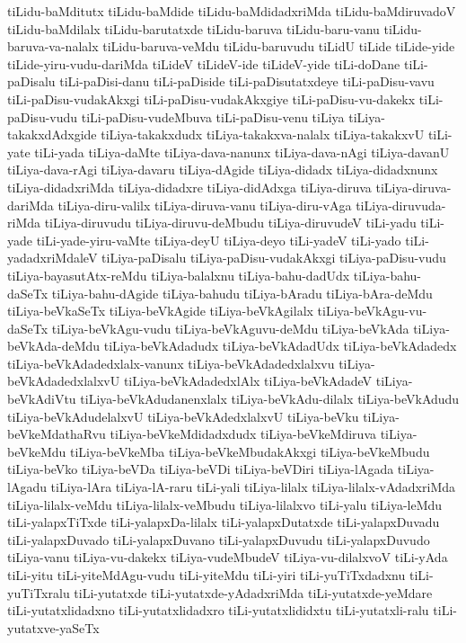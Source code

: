 {tiLidu-baMditutx
tiLidu-baMdide
tiLidu-baMdidadxriMda
tiLidu-baMdiruvadoV
tiLidu-baMdilalx
tiLidu-barutatxde
tiLidu-baruva
tiLidu-baru-vanu
tiLidu-baruva-va-nalalx
tiLidu-baruva-veMdu
tiLidu-baruvudu
tiLidU
tiLide
tiLide-yide
tiLide-yiru-vudu-dariMda
tiLideV
tiLideV-ide
tiLideV-yide
tiLi-doDane
tiLi-paDisalu
tiLi-paDisi-danu
tiLi-paDiside
tiLi-paDisutatxdeye
tiLi-paDisu-vavu
tiLi-paDisu-vudakAkxgi
tiLi-paDisu-vudakAkxgiye
tiLi-paDisu-vu-dakekx
tiLi-paDisu-vudu
tiLi-paDisu-vudeMbuva
tiLi-paDisu-venu
tiLiya
tiLiya-takakxdAdxgide
tiLiya-takakxdudx
tiLiya-takakxva-nalalx
tiLiya-takakxvU
tiLi-yate
tiLi-yada
tiLiya-daMte
tiLiya-dava-nanunx
tiLiya-dava-nAgi
tiLiya-davanU
tiLiya-dava-rAgi
tiLiya-davaru
tiLiya-dAgide
tiLiya-didadx
tiLiya-didadxnunx
tiLiya-didadxriMda
tiLiya-didadxre
tiLiya-didAdxga
tiLiya-diruva
tiLiya-diruva-dariMda
tiLiya-diru-valilx
tiLiya-diruva-vanu
tiLiya-diru-vAga
tiLiya-diruvuda-riMda
tiLiya-diruvudu
tiLiya-diruvu-deMbudu
tiLiya-diruvudeV
tiLi-yadu
tiLi-yade
tiLi-yade-yiru-vaMte
tiLiya-deyU
tiLiya-deyo
tiLi-yadeV
tiLi-yado
tiLi-yadadxriMdaleV
tiLiya-paDisalu
tiLiya-paDisu-vudakAkxgi
tiLiya-paDisu-vudu
tiLiya-bayasutAtx-reMdu
tiLiya-balalxnu
tiLiya-bahu-dadUdx
tiLiya-bahu-daSeTx
tiLiya-bahu-dAgide
tiLiya-bahudu
tiLiya-bAradu
tiLiya-bAra-deMdu
tiLiya-beVkaSeTx
tiLiya-beVkAgide
tiLiya-beVkAgilalx
tiLiya-beVkAgu-vu-daSeTx
tiLiya-beVkAgu-vudu
tiLiya-beVkAguvu-deMdu
tiLiya-beVkAda
tiLiya-beVkAda-deMdu
tiLiya-beVkAdadudx
tiLiya-beVkAdadUdx
tiLiya-beVkAdadedx
tiLiya-beVkAdadedxlalx-vanunx
tiLiya-beVkAdadedxlalxvu
tiLiya-beVkAdadedxlalxvU
tiLiya-beVkAdadedxlAlx
tiLiya-beVkAdadeV
tiLiya-beVkAdiVtu
tiLiya-beVkAdudanenxlalx
tiLiya-beVkAdu-dilalx
tiLiya-beVkAdudu
tiLiya-beVkAdudelalxvU
tiLiya-beVkAdedxlalxvU
tiLiya-beVku
tiLiya-beVkeMdathaRvu
tiLiya-beVkeMdidadxdudx
tiLiya-beVkeMdiruva
tiLiya-beVkeMdu
tiLiya-beVkeMba
tiLiya-beVkeMbudakAkxgi
tiLiya-beVkeMbudu
tiLiya-beVko
tiLiya-beVDa
tiLiya-beVDi
tiLiya-beVDiri
tiLiya-lAgada
tiLiya-lAgadu
tiLiya-lAra
tiLiya-lA-raru
tiLi-yali
tiLiya-lilalx
tiLiya-lilalx-vAdadxriMda
tiLiya-lilalx-veMdu
tiLiya-lilalx-veMbudu
tiLiya-lilalxvo
tiLi-yalu
tiLiya-leMdu
tiLi-yalapxTiTxde
tiLi-yalapxDa-lilalx
tiLi-yalapxDutatxde
tiLi-yalapxDuvadu
tiLi-yalapxDuvado
tiLi-yalapxDuvano
tiLi-yalapxDuvudu
tiLi-yalapxDuvudo
tiLiya-vanu
tiLiya-vu-dakekx
tiLiya-vudeMbudeV
tiLiya-vu-dilalxvoV
tiLi-yAda
tiLi-yitu
tiLi-yiteMdAgu-vudu
tiLi-yiteMdu
tiLi-yiri
tiLi-yuTiTxdadxnu
tiLi-yuTiTxralu
tiLi-yutatxde
tiLi-yutatxde-yAdadxriMda
tiLi-yutatxde-yeMdare
tiLi-yutatxlidadxno
tiLi-yutatxlidadxro
tiLi-yutatxlididxtu
tiLi-yutatxli-ralu
tiLi-yutatxve-yaSeTx
}
